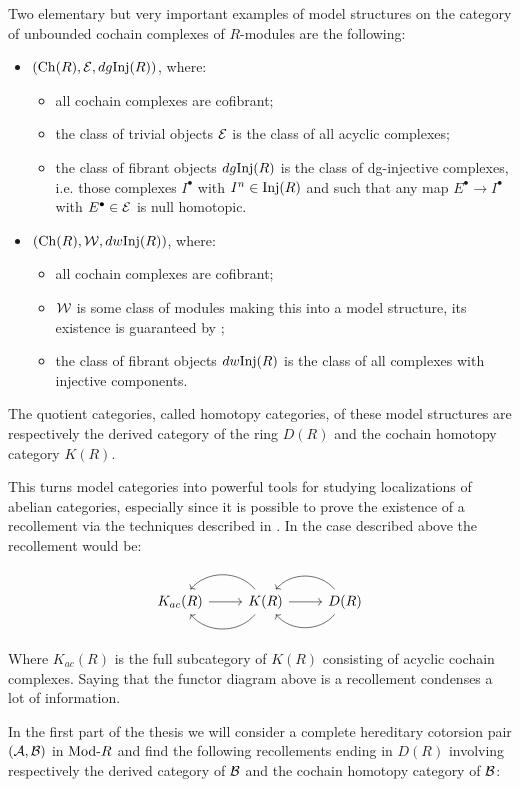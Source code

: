 Two elementary but very important examples of model structures on the category of unbounded cochain complexes of $R$-modules are the following:
\begin{itemize}
  \item $(\mathrm{Ch}(R),\mathcal{E},dg \mathrm{Inj}(R))$, where:
    \begin{itemize}
      \item all cochain complexes are cofibrant;
      \item the class of trivial objects $\mathcal{E}$ is the class of all acyclic complexes;
      \item the class of fibrant objects $dg \mathrm{Inj}(R)$ is the class of dg-injective complexes, i.e. those complexes $I^\bullet$ with $I^n\in\mathrm{Inj}(R)$ and such that any map $E^\bullet \to I^\bullet$ with $E^\bullet\in\mathcal{E}$ is null homotopic.
    \end{itemize}
  \item $(\mathrm{Ch}(R),\mathcal{W},dw \mathrm{Inj}(R))$, where:
    \begin{itemize}
      \item all cochain complexes are cofibrant;
      \item $\mathcal{W}$ is some class of modules making this into a model structure, its existence is guaranteed by \cite{G4};
      \item the class of fibrant objects $dw \mathrm{Inj}(R)$ is the class of all complexes with injective components.
    \end{itemize}
\end{itemize}

The quotient categories, called homotopy categories, of these model structures are respectively the derived category of the ring $D(R)$ and the cochain homotopy category $K(R)$.

This turns model categories into powerful tools for studying localizations of abelian categories, especially since it is possible to prove the existence of a recollement via the techniques described in \cite{G7}. In the case described above the recollement would be:

\begin{equation*}
\recdiagram{K_{ac}(R)}{K(R)}{D(R)}
\end{equation*}

Where $K_{ac}(R)$ is the full subcategory of $K(R)$ consisting of acyclic cochain complexes. Saying that the functor diagram above is a recollement condenses a lot of information.

In the first part of the thesis we will consider a complete hereditary cotorsion pair $(\mathcal{A},\mathcal{B})$ in $\mathrm{Mod}\textrm{-}R$ and find the following recollements ending in $D(R)$ involving respectively the derived category of $\mathcal{B}$ and the cochain homotopy category of $\mathcal{B}$:

